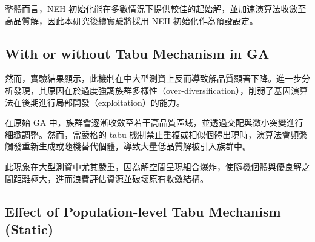 \documentclass[conference]{IEEEtran}
\begin{document}
整體而言，NEH 初始化能在多數情況下提供較佳的起始解，並加速演算法收斂至高品質解，因此本研究後續實驗將採用 NEH 初始化作為預設設定。
\begin{table}[htbp]
\caption{比較有無NEH初始化之平均與最小Makespan}
\label{tab:neh_min_avg}
\centering
{}
\end{table}


\subsection{With or without Tabu Mechanism in GA}

然而，實驗結果顯示，此機制在中大型測資上反而導致解品質顯著下降。進一步分析發現，其原因在於過度強調族群多樣性（over-diversification），削弱了基因演算法在後期進行局部開發（exploitation）的能力。

在原始 GA 中，族群會逐漸收斂至若干高品質區域，並透過交配與微小突變進行細緻調整。然而，當嚴格的 tabu 機制禁止重複或相似個體出現時，演算法會頻繁觸發重新生成或隨機替代個體，導致大量低品質解被引入族群中。

此現象在大型測資中尤其嚴重，因為解空間呈現組合爆炸，使隨機個體與優良解之間距離極大，進而浪費評估資源並破壞原有收斂結構。
\subsection{Effect of Population-level Tabu Mechanism (Static)}
\end{document}
